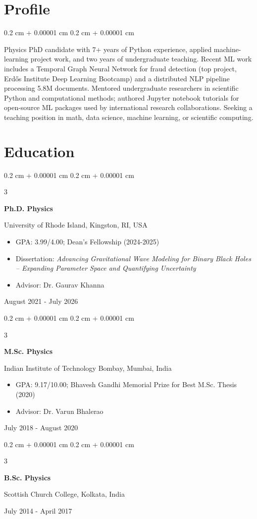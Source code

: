 \documentclass[10pt, letterpaper]{article}
\newenvironment{highlights}{
    \begin{itemize}[
        topsep=0.10 cm,
        parsep=0.10 cm,
        partopsep=0pt,
        itemsep=0pt,
        leftmargin=0.4 cm + 10pt
    ]
}{
    \end{itemize}
}
\newenvironment{onecolentry}{
    \begin{adjustwidth}{
        0.2 cm + 0.00001 cm
    }{
        0.2 cm + 0.00001 cm
    }
}{
    \end{adjustwidth}
}
\newenvironment{threecolentry}[3][]{
    \onecolentry
    \def\thirdColumn{#3}
    \setcolumnwidth{2.5 cm, \fill, 4.5 cm}
    \begin{paracol}{3}
    {\raggedright #2} \switchcolumn
}{
    \switchcolumn \raggedleft \thirdColumn
    \end{paracol}
    \endonecolentry
}
\begin{document}
\section{Profile}
  \begin{onecolentry}
    Physics PhD candidate with 7+ years of Python experience, applied machine-learning project
    work, and two years of undergraduate teaching. Recent ML work includes 
    a Temporal Graph Neural Network for fraud detection (top project, Erd\H{o}s Institute 
    Deep Learning Bootcamp) and a distributed NLP pipeline processing 5.8M documents. 
    Mentored undergraduate researchers in scientific Python and computational methods; 
    authored Jupyter notebook tutorials for open-source ML packages used by international 
    research collaborations. Seeking a teaching position in math, data science, machine learning, 
    or scientific computing.
  \end{onecolentry}
 
\section{Education}
 
\begin{threecolentry}{\textbf{Ph.D. Physics}}{
  August 2021 - July 2026
}
  University of Rhode Island, Kingston, RI, USA
  \begin{highlights}
    \item GPA: 3.99/4.00; Dean's Fellowship (2024-2025)
    \item Dissertation: \textit{Advancing Gravitational Wave Modeling for Binary Black Holes -- Expanding Parameter Space and Quantifying Uncertainty}
    \item Advisor: Dr. Gaurav Khanna
  \end{highlights}
\end{threecolentry}
 
\begin{threecolentry}{\textbf{M.Sc. Physics}}{
  July 2018 - August 2020
}
  Indian Institute of Technology Bombay, Mumbai, India
  \begin{highlights}
    \item GPA: 9.17/10.00; Bhavesh Gandhi Memorial Prize for Best M.Sc. Thesis (2020)
    \item Advisor: Dr. Varun Bhalerao
  \end{highlights}
\end{threecolentry}
 
\begin{threecolentry}{\textbf{B.Sc. Physics}}{
  July 2014 - April 2017
}
  Scottish Church College, Kolkata, India
\end{threecolentry}
 
\end{document}
